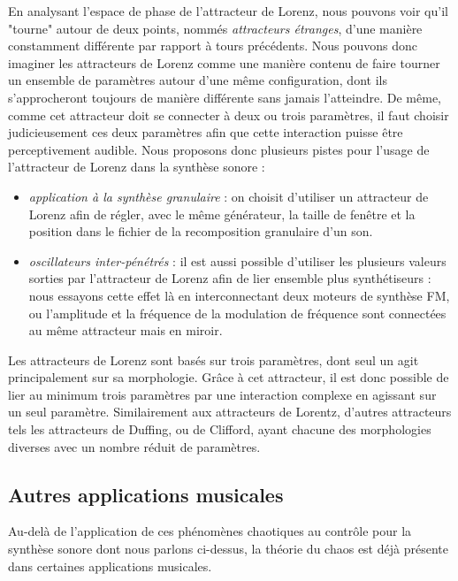 \documentclass[12pt,a4paper]{article}
\begin{document}
En analysant l'espace de phase de l'attracteur de Lorenz, nous pouvons voir qu'il "tourne" autour de deux points, nommés \textit{attracteurs étranges}, d'une manière constamment différente par rapport à tours précédents. Nous pouvons donc imaginer les attracteurs de Lorenz comme une manière contenu de faire tourner un ensemble de paramètres autour d'une même configuration, dont ils s'approcheront toujours de manière différente sans jamais l'atteindre. De même, comme cet attracteur doit se connecter à deux ou trois paramètres, il faut choisir judicieusement ces deux paramètres afin que cette interaction puisse être perceptivement audible. Nous proposons donc plusieurs pistes pour l'usage de l'attracteur de Lorenz dans la synthèse sonore : \\

\begin{itemize}
\item \textit{application à la synthèse granulaire} : on choisit d'utiliser un attracteur de Lorenz afin de régler, avec le même générateur, la taille de fenêtre et la position dans le fichier de la recomposition granulaire d'un son.
\item \textit{oscillateurs inter-pénétrés} : il est aussi possible d'utiliser les plusieurs valeurs sorties par l'attracteur de Lorenz afin de lier ensemble plus synthétiseurs : nous essayons cette effet là en interconnectant deux moteurs de synthèse FM, ou l'amplitude et la fréquence de la modulation de fréquence sont connectées au même attracteur mais en miroir. \\
\end{itemize}

Les attracteurs de Lorenz sont basés sur trois paramètres, dont seul un agit principalement sur sa morphologie. Grâce à cet attracteur, il est donc possible de lier au minimum trois paramètres par une interaction complexe en agissant sur un seul paramètre. Similairement aux attracteurs de Lorentz, d'autres attracteurs tels les attracteurs de Duffing, ou de Clifford, ayant chacune des morphologies diverses avec un nombre réduit de paramètres.


\subsection{Autres applications musicales}
Au-delà de l'application de ces phénomènes chaotiques au contrôle pour la synthèse sonore dont nous parlons ci-dessus, la théorie du chaos est déjà présente dans certaines applications musicales.
\end{document}
